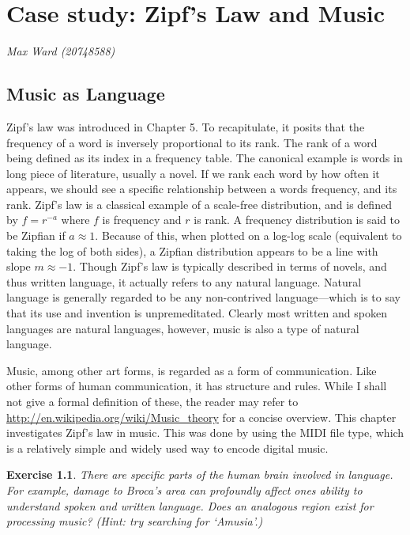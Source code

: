 \documentclass[10pt]{book}
\title{\thetitle}
\author{Allen B. Downey}
\newtheorem{exercise}{Exercise}[chapter]
\begin{document}
\chapter{Case study: Zipf's Law and Music}

{\em Max Ward (20748588)}

\section{Music as Language}

Zipf's law was introduced in Chapter 5. To recapitulate, it posits that the frequency of a word is inversely proportional to its rank. The rank of a word being defined as its index in a frequency table. The canonical example is words in long piece of literature, usually a novel. If we rank each word by how often it appears, we should see a specific relationship between a words frequency, and its rank. Zipf's law is a classical example of a scale-free distribution, and is defined by $f = r^{-a}$ where $f$ is frequency and $r$ is rank. A frequency distribution is said to be Zipfian if $a \approx 1$. Because of this, when plotted on a log-log scale (equivalent to taking the log of both sides), a Zipfian distribution appears to be a line with slope $m \approx -1$. Though Zipf's law is typically described in terms of novels, and thus written language, it actually refers to any natural language. Natural language is generally regarded to be any non-contrived language---which is to say that its use and invention is unpremeditated. Clearly most written and spoken languages are natural languages, however, music is also a type of natural language.

Music, among other art forms, is regarded as a form of communication. Like other forms of human communication, it has structure and rules. While I shall not give a formal definition of these, the reader may refer to \url{http://en.wikipedia.org/wiki/Music_theory} for a concise overview. This chapter investigates Zipf's law in music. This was done by using the MIDI file type, which is a relatively simple and widely used way to encode digital music.


\begin{exercise}

There are specific parts of the human brain involved in language. For example, damage to Broca's area can profoundly affect ones ability to understand spoken and written language. Does an analogous region exist for processing music? (Hint: try searching for `Amusia'.)

\end{exercise}
\end{document}
